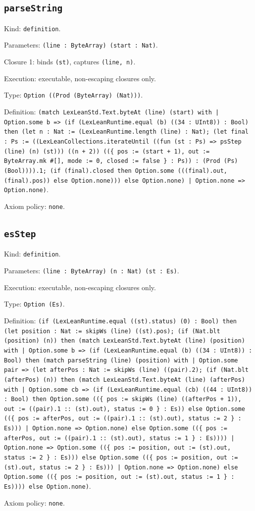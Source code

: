 \documentclass[11pt]{article}
\begin{document}
\subsection*{\texttt{parseString}}
\noindent Kind: \texttt{definition}.\par
\noindent Parameters: \texttt{(line : ByteArray) (start : Nat)}.\par
\noindent Closure 1: binds \texttt{(st)}, captures \texttt{(line, n)}.\par
\noindent Execution: executable, non-escaping closures only.\par
\noindent Type: \texttt{Option ((Prod (ByteArray) (Nat)))}.\par
\noindent Definition: \texttt{(match LexLeanStd.Text.byteAt (line) (start) with | Option.some b => (if (LexLeanRuntime.equal (b) ((34 : UInt8)) : Bool) then (let n : Nat := (LexLeanRuntime.length (line) : Nat); (let final : Ps := ((LexLeanCollections.iterateUntil ((fun (st : Ps) => psStep (line) (n) (st))) ((n + 2)) ((\{ pos := (start + 1), out := ByteArray.mk \#[], mode := 0, closed := false \} : Ps)) : (Prod (Ps) (Bool)))).1; (if (final).closed then Option.some (((final).out, (final).pos)) else Option.none))) else Option.none) | Option.none => Option.none)}.\par
\noindent Axiom policy: \texttt{none}.\par
\subsection*{\texttt{esStep}}
\noindent Kind: \texttt{definition}.\par
\noindent Parameters: \texttt{(line : ByteArray) (n : Nat) (st : Es)}.\par
\noindent Execution: executable, non-escaping closures only.\par
\noindent Type: \texttt{Option (Es)}.\par
\noindent Definition: \texttt{(if (LexLeanRuntime.equal ((st).status) (0) : Bool) then (let position : Nat := skipWs (line) ((st).pos); (if (Nat.blt (position) (n)) then (match LexLeanStd.Text.byteAt (line) (position) with | Option.some b => (if (LexLeanRuntime.equal (b) ((34 : UInt8)) : Bool) then (match parseString (line) (position) with | Option.some pair => (let afterPos : Nat := skipWs (line) ((pair).2); (if (Nat.blt (afterPos) (n)) then (match LexLeanStd.Text.byteAt (line) (afterPos) with | Option.some cb => (if (LexLeanRuntime.equal (cb) ((44 : UInt8)) : Bool) then Option.some ((\{ pos := skipWs (line) ((afterPos + 1)), out := ((pair).1 :: (st).out), status := 0 \} : Es)) else Option.some ((\{ pos := afterPos, out := ((pair).1 :: (st).out), status := 2 \} : Es))) | Option.none => Option.none) else Option.some ((\{ pos := afterPos, out := ((pair).1 :: (st).out), status := 1 \} : Es)))) | Option.none => Option.some ((\{ pos := position, out := (st).out, status := 2 \} : Es))) else Option.some ((\{ pos := position, out := (st).out, status := 2 \} : Es))) | Option.none => Option.none) else Option.some ((\{ pos := position, out := (st).out, status := 1 \} : Es)))) else Option.none)}.\par
\noindent Axiom policy: \texttt{none}.\par
\end{document}
